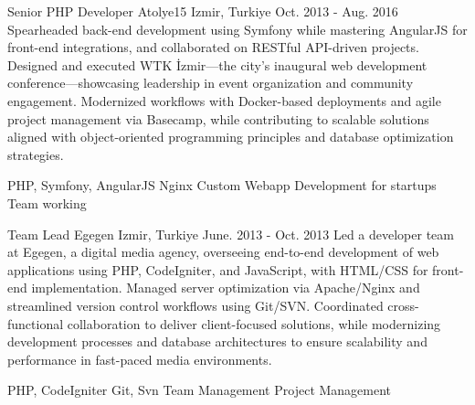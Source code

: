 \begin{cventries}
    \cventry
    {Senior PHP Developer} %
    {Atolye15} %
    {Izmir, Turkiye} %
    {Oct. 2013 - Aug. 2016} %
    {
      Spearheaded back-end development using Symfony while mastering AngularJS for front-end integrations, and collaborated on RESTful API-driven projects. Designed and executed WTK İzmir—the city’s inaugural web development conference—showcasing leadership in event organization and community engagement. Modernized workflows with Docker-based deployments and agile project management via Basecamp, while contributing to scalable solutions aligned with object-oriented programming principles and database optimization strategies.
    }
    {
      \begin{cvsubentries}%
        \cvsubentry {} {PHP, Symfony, AngularJS} {} {} 
        \cvsubentry {} {Nginx} {} {} 
        \cvsubentry {} {Custom Webapp Development for startups} {} {} 
        \cvsubentry {} {Team working} {} {} 
      \end{cvsubentries}
    }

    \cventry
    {Team Lead} %
    {Egegen} %
    {Izmir, Turkiye} %
    {June. 2013 - Oct. 2013} %
    {
      Led a developer team at Egegen, a digital media agency, overseeing end-to-end development of web applications using PHP, CodeIgniter, and JavaScript, with HTML/CSS for front-end implementation. Managed server optimization via Apache/Nginx and streamlined version control workflows using Git/SVN. Coordinated cross-functional collaboration to deliver client-focused solutions, while modernizing development processes and database architectures to ensure scalability and performance in fast-paced media environments.
    }
    {
      \begin{cvsubentries}%
        \cvsubentry {} {PHP, CodeIgniter} {} {} 
        \cvsubentry {} {Git, Svn} {} {} 
        \cvsubentry {} {Team Management} {} {} 
        \cvsubentry {} {Project Management} {} {} 
      \end{cvsubentries}
    }


\end{cventries}
